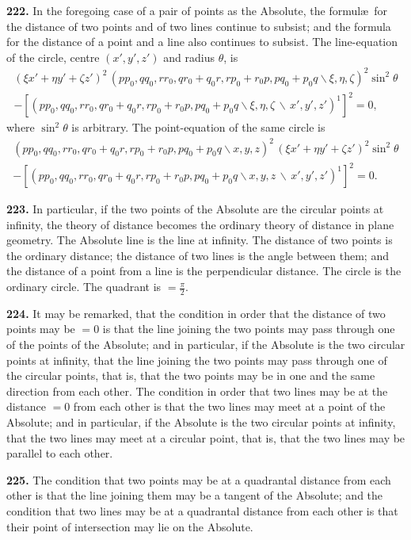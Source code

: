 \documentclass[11pt,a4paper]{book}
\begin{document}
\begin{center}
\textbf{222.} In the foregoing case of a pair of points as the Absolute, the formul\ae\ for the
distance of two points and of two lines continue to subsist; and the formula for the
distance of a point and a line also continues to subsist. The line-equation of the
circle, centre $(x',y',z')$ and radius $\theta$, is
\begin{multline*}
(\xi x'+\eta y'+\zeta z')^2\,(pp_0,qq_0,rr_0,qr_0+q_0r,rp_0+r_0p,pq_0+p_0q\!\backslash \xi,\eta,\zeta)^2\sin^2\theta\\
- [(pp_0,qq_0,rr_0,qr_0+q_0r,rp_0+r_0p,pq_0+p_0q\!\backslash \xi,\eta,\zeta\,\backslash\,x',y',z')^1]^2 = 0,
\end{multline*}
where $\sin^2\theta$ is arbitrary. The point-equation of the same circle is
\begin{multline*}
(pp_0,qq_0,rr_0,qr_0+q_0r,rp_0+r_0p,pq_0+p_0q\!\backslash x,y,z)^2\,(\xi x'+\eta y'+\zeta z')^2\sin^2\theta\\
- [(pp_0,qq_0,rr_0,qr_0+q_0r,rp_0+r_0p,pq_0+p_0q\!\backslash x,y,z\,\backslash\,x',y',z')^1]^2 = 0.
\end{multline*}

\textbf{223.} In particular, if the two points of the Absolute are the circular points at
infinity, the theory of distance becomes the ordinary theory of distance in plane
geometry. The Absolute line is the line at infinity. The distance of two points is the
ordinary distance; the distance of two lines is the angle between them; and the distance
of a point from a line is the perpendicular distance. The circle is the ordinary circle.
The quadrant is $=\frac{\pi}{2}$.

\textbf{224.} It may be remarked, that the condition in order that the distance of two
points may be $=0$ is that the line joining the two points may pass through one of the
points of the Absolute; and in particular, if the Absolute is the two circular points at
infinity, that the line joining the two points may pass through one of the circular points,
that is, that the two points may be in one and the same direction from each other. The
condition in order that two lines may be at the distance $=0$ from each other is that
the two lines may meet at a point of the Absolute; and in particular, if the Absolute is
the two circular points at infinity, that the two lines may meet at a circular point, that
is, that the two lines may be parallel to each other.

\textbf{225.} The condition that two points may be at a quadrantal distance from each
other is that the line joining them may be a tangent of the Absolute; and the condition
that two lines may be at a quadrantal distance from each other is that their point of
intersection may lie on the Absolute.


\end{center}
\end{document}
